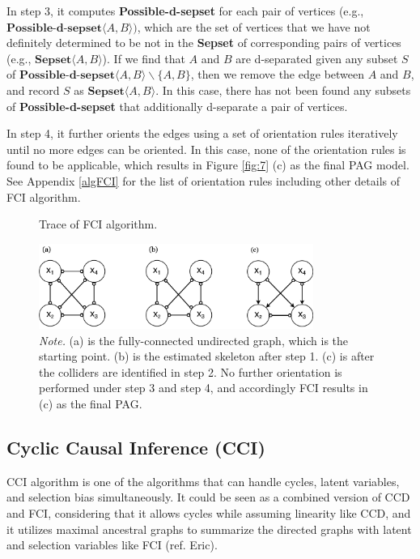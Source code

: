 \documentclass[11pt]{article}
\theoremstyle{definition}
\begin{document}
In step 3, it computes \textbf{Possible-d-sepset} for each pair of vertices (e.g., $\textbf{Possible-d-sepset} \langle A, B \rangle)$, which are the set of vertices that we have not definitely determined to be not in the \textbf{Sepset} of corresponding pairs of vertices (e.g., $\mathbf{Sepset} \langle A, B \rangle$). If we find that $A$ and $B$ are d-separated given any subset $S$ of $\textbf{Possible-d-sepset} \langle A, B \rangle \backslash \{A, B\}$, then we remove the edge between $A$ and $B$, and record $S$ as $\mathbf{Sepset} \langle A, B \rangle$. In this case, there has not been found any subsets of \textbf{Possible-d-sepset} that additionally d-separate a pair of vertices.

In step 4, it further orients the edges using a set of orientation rules iteratively until no more edges can be oriented. In this case, none of the orientation rules is found to be applicable, which results in Figure \ref{fig:7} (c) as the final PAG model. See Appendix \ref{algFCI} for the list of orientation rules including other details of FCI algorithm.





\begin{figure}[H]
    \centering
        \caption{Trace of FCI algorithm.}
        \includegraphics[width=0.8\textwidth]{figures/FCItrace.png}
        \vspace{1mm}
        \caption*{\textit{Note.} (a) is the fully-connected undirected graph, which is the starting point. (b) is the estimated skeleton after step 1. (c) is after the colliders are identified in step 2. No further orientation is performed under step 3 and step 4, and accordingly FCI results in (c) as the final PAG.}
    \label{fig:8}
\end{figure}



\subsection{Cyclic Causal Inference (CCI)}
CCI algorithm is one of the algorithms that can handle cycles, latent variables, and selection bias simultaneously. It could be seen as a combined version of CCD and FCI, considering that it allows cycles while assuming linearity like CCD, and it utilizes maximal ancestral graphs to summarize the directed graphs with latent and selection variables like FCI (ref. Eric).
\end{document}
